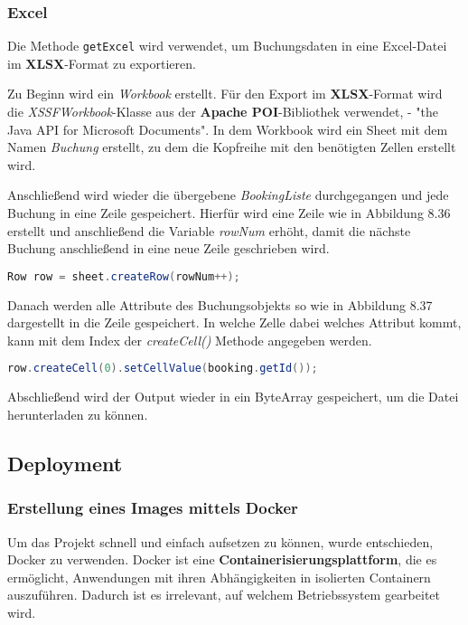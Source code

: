 	\subsubsection{Excel}
	Die Methode \texttt{getExcel} wird verwendet, um Buchungsdaten in eine Excel-Datei im \textbf{XLSX}-Format zu exportieren. 
	
	\noindent Zu Beginn wird ein \textit{Workbook} erstellt. Für den Export im \textbf{XLSX}-Format wird die \textit{XSSFWorkbook}-Klasse aus der \textbf{Apache POI}-Bibliothek verwendet, - "the Java API for Microsoft Documents". In dem Workbook wird ein Sheet mit dem Namen \textit{Buchung} erstellt, zu dem die Kopfreihe mit den benötigten Zellen erstellt wird.
	
	\noindent Anschließend wird wieder die übergebene \textit{BookingListe} durchgegangen und jede Buchung in eine Zeile gespeichert. Hierfür wird eine Zeile wie in Abbildung 8.36 erstellt und anschließend die Variable \textit{rowNum} erhöht, damit die nächste Buchung anschließend in eine neue Zeile geschrieben wird.
	
\begin{lstlisting}[language=Java, caption={Code-Ausschnitt: Reihe erstellen.}]
Row row = sheet.createRow(rowNum++);
\end{lstlisting}
    
	\noindent Danach werden alle Attribute des Buchungsobjekts so wie in Abbildung 8.37 dargestellt in die Zeile gespeichert. In welche Zelle dabei welches Attribut kommt, kann mit dem Index der \textit{createCell()} Methode angegeben werden. 

\begin{lstlisting}[language=Java, caption={Code-Ausschnitt: Zelle befüllen.}]
row.createCell(0).setCellValue(booking.getId());
\end{lstlisting}

	\noindent Abschließend wird der Output wieder in ein ByteArray gespeichert, um die Datei herunterladen zu können.
	
	
	
	
	
	\newpage
	\subsection{Deployment}
	\label{sec:deployment}
	\subsubsection{Erstellung eines Images mittels Docker}
	Um das Projekt schnell und einfach aufsetzen zu können, wurde entschieden, Docker zu verwenden. Docker ist eine \textbf{Containerisierungsplattform}, die es ermöglicht, Anwendungen mit ihren Abhängigkeiten in isolierten Containern auszuführen. Dadurch ist es irrelevant, auf welchem Betriebssystem gearbeitet wird.
	
